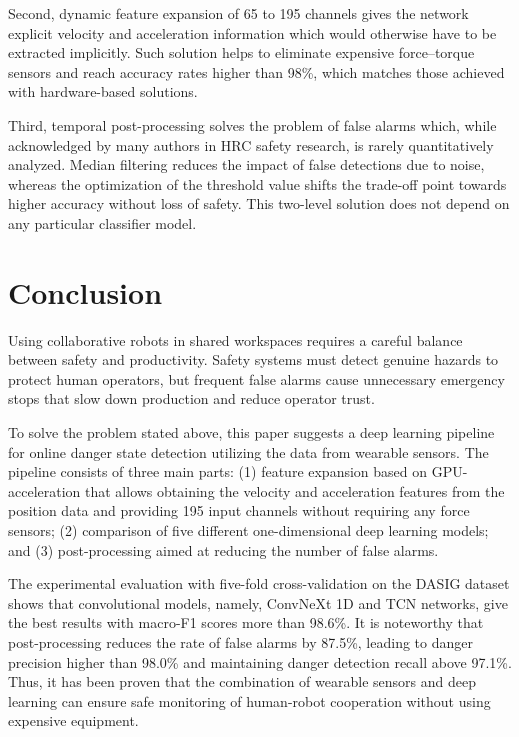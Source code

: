 \documentclass[DTMColor]{ROB-New}
\begin{document}
Second, dynamic feature expansion of 65 to 195 channels gives the network explicit velocity and acceleration information which would otherwise have to be extracted implicitly. Such solution helps to eliminate expensive force–torque sensors and reach accuracy rates higher than 98\%, which matches those achieved with hardware-based solutions.

Third, temporal post-processing solves the problem of false alarms which, while acknowledged by many authors in HRC safety research, is rarely quantitatively analyzed. Median filtering reduces the impact of false detections due to noise, whereas the optimization of the threshold value shifts the trade-off point towards higher accuracy without loss of safety. This two-level solution does not depend on any particular classifier model.

\section{Conclusion}\label{sec:conclusion}

Using collaborative robots in shared workspaces requires a careful balance between safety and productivity. Safety systems must detect genuine hazards to protect human operators, but frequent false alarms cause unnecessary emergency stops that slow down production and reduce operator trust.

To solve the problem stated above, this paper suggests a deep learning pipeline for online danger state detection utilizing the data from wearable sensors. The pipeline consists of three main parts: (1) feature expansion based on GPU-acceleration that allows obtaining the velocity and acceleration features from the position data and providing 195 input channels without requiring any force sensors; (2) comparison of five different one-dimensional deep learning models; and (3) post-processing aimed at reducing the number of false alarms.

The experimental evaluation with five-fold cross-validation on the DASIG dataset shows that convolutional models, namely, ConvNeXt 1D and TCN networks, give the best results with macro-F1 scores more than 98.6\%. It is noteworthy that post-processing reduces the rate of false alarms by 87.5\%, leading to danger precision higher than 98.0\% and maintaining danger detection recall above 97.1\%. Thus, it has been proven that the combination of wearable sensors and deep learning can ensure safe monitoring of human-robot cooperation without using expensive equipment.
\end{document}

